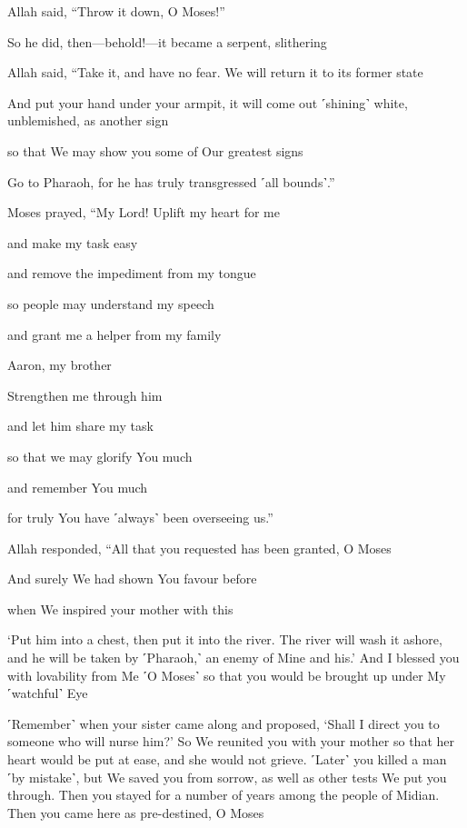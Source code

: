 Allah said, “Throw it down, O Moses!”

So he did, then—behold!—it became a serpent, slithering

Allah said, “Take it, and have no fear. We will return it to its former state

And put your hand under your armpit, it will come out ˹shining˺ white, unblemished, as another sign

so that We may show you some of Our greatest signs

Go to Pharaoh, for he has truly transgressed ˹all bounds˺.”

Moses prayed, “My Lord! Uplift my heart for me

and make my task easy

and remove the impediment from my tongue

so people may understand my speech

and grant me a helper from my family

Aaron, my brother

Strengthen me through him

and let him share my task

so that we may glorify You much

and remember You much

for truly You have ˹always˺ been overseeing us.”

Allah responded, “All that you requested has been granted, O Moses

And surely We had shown You favour before

when We inspired your mother with this

‘Put him into a chest, then put it into the river. The river will wash it ashore, and he will be taken by ˹Pharaoh,˺ an enemy of Mine and his.’ And I blessed you with lovability from Me ˹O Moses˺ so that you would be brought up under My ˹watchful˺ Eye

˹Remember˺ when your sister came along and proposed, ‘Shall I direct you to someone who will nurse him?’ So We reunited you with your mother so that her heart would be put at ease, and she would not grieve. ˹Later˺ you killed a man ˹by mistake˺, but We saved you from sorrow, as well as other tests We put you through. Then you stayed for a number of years among the people of Midian. Then you came here as pre-destined, O Moses

